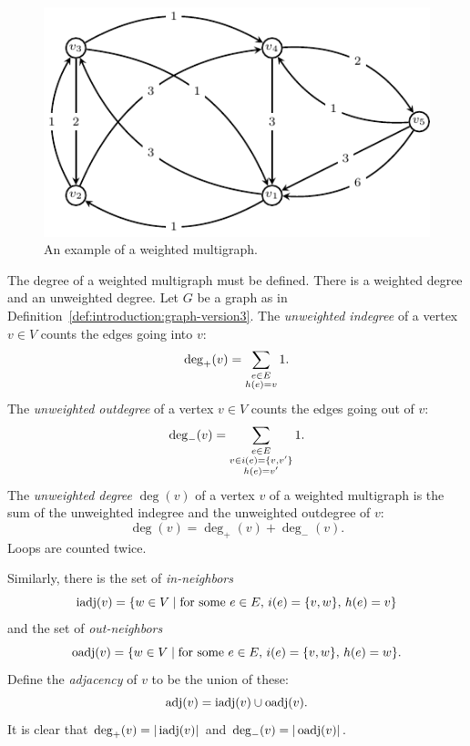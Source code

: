 \begin{figure}[!htbp]
\centering
\includegraphics{image/introduction/weighted-multigraph}
\caption{An example of a weighted multigraph.}
\label{fig:introduction:weighted_multigraph}
\end{figure}

The degree of a weighted multigraph must be defined. There is a
weighted degree and an unweighted degree. Let $G$ be a graph as in
Definition~\ref{def:introduction:graph-version3}. The
\emph{unweighted indegree} of a vertex
$v \in V$ counts the edges going into $v$:
\[
\deg_+(v)\index{$\deg_+$}
=
\sum_{\substack{e \in E \\ h(e)=v}} 1.
\]
The \emph{unweighted outdegree} of a
vertex $v \in V$ counts the edges going out of $v$:
\[
\deg_-(v)\index{$\deg_-$}
=
\sum_{\substack{e \in E \\ v \in i(e)=\{v,v'\} \\ h(e)= v'}} 1.
\]
The \emph{unweighted degree} $\deg(v)$ of a
vertex $v$ of a weighted multigraph is the sum of the unweighted
indegree and the unweighted outdegree of $v$:
\[
\deg(v)
=
\deg_+(v) + \deg_-(v).
\]
Loops are counted twice.

Similarly, there is the set of
\emph{in-neighbors}
\[
\operatorname*{iadj}(v)
=
\{w \in V \mid \text{for some } e \in E,\, i(e)=\{v,w\},\, h(e)=v\}
\]
and the set of \emph{out-neighbors}
\[
\operatorname*{oadj}(v)
=
\{w \in V \mid \text{for some } e \in E,\, i(e)=\{v,w\},\, h(e)=w\}.
\]
Define the \emph{adjacency} of $v$ to be
the union of these:
\[
\operatorname*{adj}(v)
=
\operatorname*{iadj}(v) \cup \operatorname*{oadj}(v).
\]
It is clear that $\deg_+(v) = |\operatorname*{iadj}(v)|$ and $\deg_-(v) = |\operatorname*{oadj}(v)|$.

